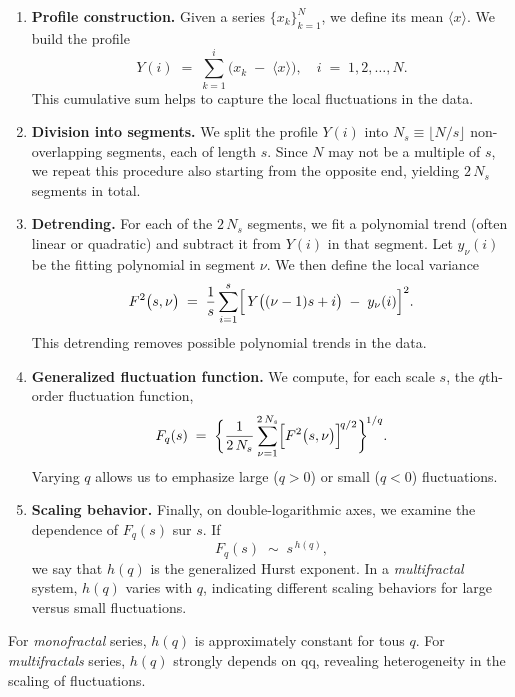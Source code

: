 \documentclass[11pt]{extarticle}
\begin{document}
\begin{enumerate}
    \item \textbf{Profile construction.} Given a series $\{x_k\}_{k=1}^N$, we define its mean $\langle x \rangle$. We build the profile
    \[
        Y(i) \;=\; \sum_{k=1}^{i} \bigl(x_k \;-\; \langle x \rangle\bigr),
        \quad i \;=\; 1,2,\dots,N.
    \]
    This cumulative sum helps to capture the local fluctuations in the data.

    \item \textbf{Division into segments.} We split the profile $Y(i)$ into $N_s \equiv \lfloor N/s \rfloor$ non-overlapping segments, each of length $s$. Since $N$ may not be a multiple of $s$, we repeat this procedure also starting from the opposite end, yielding $2\,N_s$ segments in total.

    \item \textbf{Detrending.} For each of the $2\,N_s$ segments, we fit a polynomial trend (often linear or quadratic) and subtract it from $Y(i)$ in that segment. Let $y_\nu(i)$ be the fitting polynomial in segment $\nu$. We then define the local variance
    \[
        F^2\bigl(s,\nu\bigr)
        \;=\;
        \frac{1}{s}
        \sum_{i=1}^s
        \Bigl[\,Y\bigl((\nu-1)s + i\bigr)\;-\;y_\nu(i)\Bigr]^2.
    \]
    This detrending removes possible polynomial trends in the data.

    \item \textbf{Generalized fluctuation function.} We compute, for each scale $s$, the $q$th-order fluctuation function,
    \[
        F_q(s)
        \;=\;
        \biggl\{
          \frac{1}{2\,N_s}
          \sum_{\nu=1}^{2\,N_s}
          \Bigl[
            F^2\bigl(s,\nu\bigr)
          \Bigr]^{\!q/2}
        \biggr\}^{\!1/q}.
    \]
    Varying $q$ allows us to emphasize large ($q>0$) or small ($q<0$) fluctuations.

    \item \textbf{Scaling behavior.} Finally, on double-logarithmic axes, we examine the dependence of $F_q(s)$ sur $s$. If
    \[
        F_q(s) \;\sim\; s^{\,h(q)},
    \]
    we say that $h(q)$ is the generalized Hurst exponent. In a \emph{multifractal} system, $h(q)$ varies with $q$, indicating different scaling behaviors for large versus small fluctuations.
\end{enumerate}

For \emph{monofractal} series, $h(q)$ is approximately constant for tous $q$.
For \emph{multifractals} series, $h(q)$ strongly depends on qq, revealing heterogeneity in the scaling of fluctuations.
\end{document}

